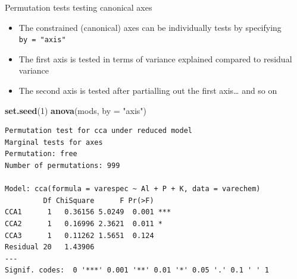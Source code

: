 \documentclass[10pt,ignorenonframetext,compress, aspectratio=169]{beamer}
\newenvironment{Shaded}{\begin{snugshade}}{\end{snugshade}}
\newcommand{\KeywordTok}[1]{\textcolor[rgb]{0.13,0.29,0.53}{\textbf{{#1}}}}
\newcommand{\DataTypeTok}[1]{\textcolor[rgb]{0.13,0.29,0.53}{{#1}}}
\newcommand{\DecValTok}[1]{\textcolor[rgb]{0.00,0.00,0.81}{{#1}}}
\newcommand{\StringTok}[1]{\textcolor[rgb]{0.31,0.60,0.02}{{#1}}}
\newcommand{\NormalTok}[1]{{#1}}
\providecommand{\tightlist}{%
  \setlength{\itemsep}{0pt}\setlength{\parskip}{0pt}}
\begin{document}
\begin{frame}[fragile]{Permutation tests \textbar{} testing canonical
axes}

\begin{itemize}
\tightlist
\item
  The constrained (canonical) axes can be individually tests by
  specifying \texttt{by\ =\ "axis"}
\item
  The first axis is tested in terms of variance explained compared to
  residual variance
\item
  The second axis is tested after partialling out the first axis\ldots{}
  and so on
\end{itemize}

\tiny

\begin{Shaded}
\begin{Highlighting}[]
\KeywordTok{set.seed}\NormalTok{(}\DecValTok{1}\NormalTok{)}
\KeywordTok{anova}\NormalTok{(mods, }\DataTypeTok{by =} \StringTok{"axis"}\NormalTok{)}
\end{Highlighting}
\end{Shaded}

\begin{verbatim}
Permutation test for cca under reduced model
Marginal tests for axes
Permutation: free
Number of permutations: 999

Model: cca(formula = varespec ~ Al + P + K, data = varechem)
         Df ChiSquare      F Pr(>F)    
CCA1      1   0.36156 5.0249  0.001 ***
CCA2      1   0.16996 2.3621  0.011 *  
CCA3      1   0.11262 1.5651  0.124    
Residual 20   1.43906                  
---
Signif. codes:  0 '***' 0.001 '**' 0.01 '*' 0.05 '.' 0.1 ' ' 1
\end{verbatim}

\normalsize

\end{frame}
\end{document}
